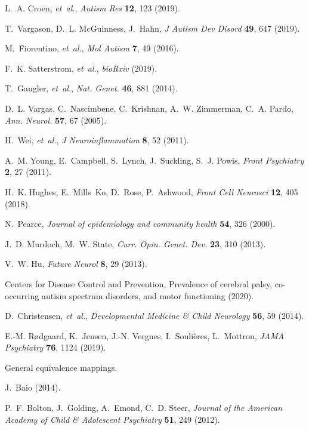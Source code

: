 \documentclass[onecolumn,,10pt]{IEEEtran}
\begin{document}
\begin{thebibliography}{10}
L.~A. Croen, {\it et~al.\/}, {\it Autism Res\/} {\bf 12}, 123 (2019).

T.~Vargason, D.~L. McGuinness, J.~Hahn, {\it J Autism Dev Disord\/} {\bf 49},
  647 (2019).

M.~Fiorentino, {\it et~al.\/}, {\it Mol Autism\/} {\bf 7}, 49 (2016).

F.~K. Satterstrom, {\it et~al.\/}, {\it bioRxiv\/}  (2019).

T.~Gaugler, {\it et~al.\/}, {\it Nat. Genet.\/} {\bf 46}, 881 (2014).

D.~L. Vargas, C.~Nascimbene, C.~Krishnan, A.~W. Zimmerman, C.~A. Pardo, {\it
  Ann. Neurol.\/} {\bf 57}, 67 (2005).

H.~Wei, {\it et~al.\/}, {\it J Neuroinflammation\/} {\bf 8}, 52 (2011).

A.~M. Young, E.~Campbell, S.~Lynch, J.~Suckling, S.~J. Powis, {\it Front
  Psychiatry\/} {\bf 2}, 27 (2011).

H.~K. Hughes, E.~Mills~Ko, D.~Rose, P.~Ashwood, {\it Front Cell Neurosci\/}
  {\bf 12}, 405 (2018).

N.~Pearce, {\it Journal of epidemiology and community health\/} {\bf 54}, 326
  (2000).

J.~D. Murdoch, M.~W. State, {\it Curr. Opin. Genet. Dev.\/} {\bf 23}, 310
  (2013).

V.~W. Hu, {\it Future Neurol\/} {\bf 8}, 29 (2013).

\textrm{Centers for Disease Control and Prevention}, Prevalence of cerebral
  palsy, co-occurring autism spectrum disorders, and motor functioning (2020).

D.~Christensen, {\it et~al.\/}, {\it Developmental Medicine \& Child
  Neurology\/} {\bf 56}, 59 (2014).

E.-M. Rødgaard, K.~Jensen, J.-N. Vergnes, I.~Soulières, L.~Mottron, {\it JAMA
  Psychiatry\/} {\bf 76}, 1124 (2019).

General equivalence mappings.

J.~Baio  (2014).

P.~F. Bolton, J.~Golding, A.~Emond, C.~D. Steer, {\it Journal of the American
  Academy of Child \& Adolescent Psychiatry\/} {\bf 51}, 249 (2012).


\end{thebibliography}
\end{document}

